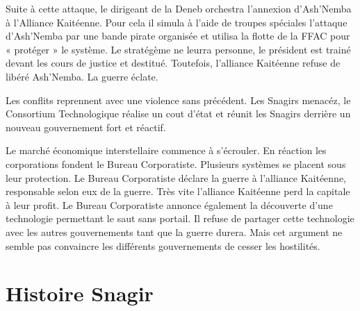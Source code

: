 \begin{multicols}{2}
Suite à cette attaque, le dirigeant de la Deneb orchestra l’annexion d’Ash’Nemba à l’Alliance Kaitéenne. Pour cela il simula à l’aide de troupes spéciales l’attaque d’Ash’Nemba par une bande pirate organisée et utilisa la flotte de la FFAC pour « protéger » le système. Le stratégème ne leurra personne, le président est trainé devant les cours de justice et destitué. Toutefois, l'alliance Kaitéenne refuse de libéré Ash'Nemba. La guerre éclate.

Les conflits reprennent avec une violence sans précédent. Les Snagirs menacéz, le Consortium Technologique réalise un cout d'état et réunit les Snagirs derrière un nouveau gouvernement fort et réactif. 

Le marché économique interstellaire commence à s'écrouler. En réaction les corporations fondent le Bureau Corporatiste. Plusieurs systèmes se placent sous leur protection. Le Bureau Corporatiste déclare la guerre à l'alliance Kaitéenne, responsable selon eux de la guerre. Très vite l'alliance Kaitéenne perd la capitale à leur profit. Le Bureau Corporatiste annonce également la découverte d'une technologie permettant le saut sans portail. Il refuse de partager cette technologie avec les autres gouvernements tant que la guerre durera. Mais cet argument ne semble pas convaincre les différents gouvernements de cesser les hostilités.

\end{multicols}

\chapter{Histoire Snagir}

